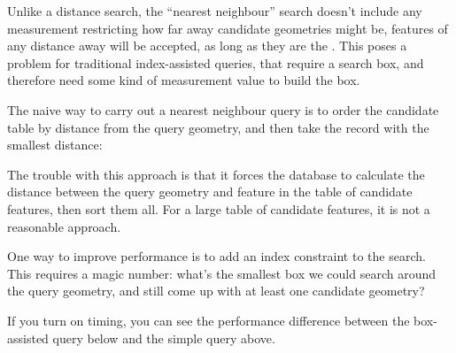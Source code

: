 \documentclass[a4paper,11pt,english]{sphinxmanual}
\begin{document}
Unlike a distance search, the “nearest neighbour” search doesn’t include any measurement restricting how far away candidate geometries might be, features of any distance away will be accepted, as long as they are the . This poses a problem for traditional index-assisted queries, that require a search box, and therefore need some kind of measurement value to build the box.

The naive way to carry out a nearest neighbour query is to order the candidate table by distance from the query geometry, and then take the record with the smallest distance:

\begin{sphinxVerbatim}[commandchars=\\\{\}]
  
   
   
   
    
 
\end{sphinxVerbatim}

The trouble with this approach is that it forces the database to calculate the distance between the query geometry and  feature in the table of candidate features, then sort them all. For a large table of  candidate features, it is not a reasonable approach.

One way to improve performance is to add an index constraint to the search. This requires a magic number: what’s the smallest box we could search around the query geometry, and still come up with at least one candidate geometry?

If you turn on timing, you can see the performance difference between the box-assisted query below and the simple query above.
\end{document}
